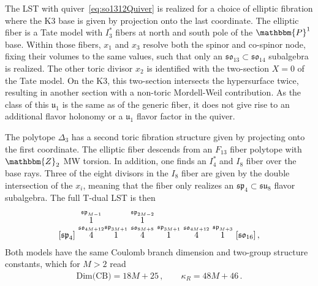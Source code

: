 \documentclass[11pt]{article}
\numberwithin{equation}{section}
\newcommand\myoverset[2]{\overset{\textstyle #1\mathstrut}{#2}}
\newcommand{\fu}{\mathfrak{u}}
\newcommand{\fsu}{\mathfrak{su}}
\newcommand{\fso}{\mathfrak{so}}
\newcommand{\fsp}{\mathfrak{sp}}
\begin{document}
The LST with quiver~\eqref{eq:so1312Quiver} is realized for a choice of elliptic fibration where the K3 base is given by projection onto the last coordinate. The elliptic fiber is a Tate model with $I_3^*$ fibers at north and south pole of the $\mathbbm{P}^1$ base. Within those fibers, $x_1$ and $x_3$ resolve both the spinor and co-spinor node, fixing their volumes to the same values, such that only an $\fso_{13} \subset \fso_{14}$ subalgebra is realized. The other toric divisor $x_2$ is identified with the two-section $X=0$ of the Tate model. On the K3, this two-section intersects the hypersurface twice, resulting in another section with a non-toric Mordell-Weil contribution. As the class of this $\fu_1$ is the same as of the generic fiber, it does not give rise to an additional flavor holonomy or a $\fu_1$ flavor factor in the quiver.

The polytope $\Delta_3$ has a second toric fibration structure given by projecting onto the first coordinate. The elliptic fiber descends from an $F_{13}$ fiber polytope with $\mathbbm{Z}_2$ MW torsion. In addition, one finds an $I_4^*$ and $I_8$ fiber over the base rays. Three of the eight divisors in the $I_8$ fiber are given by the double intersection of the $x_i$, meaning that the fiber only realizes an $\fsp_4 \subset \fsu_8$ flavor subalgebra. The full T-dual LST is then
\begin{align}
\label{eq:so13dual}
\lbrack  \mathfrak{sp}_{4}\rbrack     \, \, 
\myoverset{{\overset{\mathfrak{sp}_{M-1}}{1}}}
{\overset{\mathfrak{so}_{4M+12}}{4}}
{\overset{\mathfrak{sp}_{3M+1}}{1}}  \, \,     
\myoverset{{\overset{\mathfrak{sp}_{2M-2}}{1}}}
{\overset{\mathfrak{so}_{8M+8}}{4}} \, \,   
{\overset{\mathfrak{sp}_{3M+1}}{1}}  \, \,
{\overset{\mathfrak{so}_{4M+12}}{4}} \, \,
{\overset{\mathfrak{sp}_{M+3}}{1}} \, \,
\lbrack \mathfrak{so}_{16} \rbrack   \, ,   
\end{align} 
Both models have the same Coulomb branch dimension and two-group structure constants, which for $M>2$ read
\begin{align}
\text{Dim(CB)}=18M +25 \, , \qquad \kappa_{R}=48M+46\, .
\end{align} 
\end{document}
